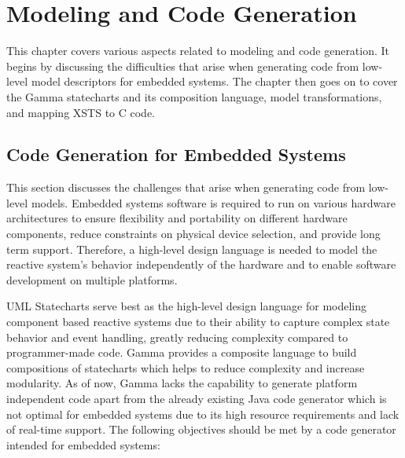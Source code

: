 \chapter{Modeling and Code Generation}

This chapter covers various aspects related to modeling and code generation. It begins by discussing the difficulties that arise when generating code from low-level model descriptors for embedded systems. The chapter then goes on to cover the Gamma statecharts and its composition language, model transformations, and mapping XSTS to C code.

\section{Code Generation for Embedded Systems}

This section discusses the challenges that arise when generating code from low-level models. Embedded systems software is required to run on various hardware architectures to ensure flexibility and portability on different hardware components, reduce constraints on physical device selection, and provide long term support. Therefore, a high-level design language is needed to model the reactive system's behavior independently of the hardware and to enable software development on multiple platforms. 

UML Statecharts serve best as the high-level design language for modeling component based reactive systems due to their ability to capture complex state behavior and event handling, greatly reducing complexity compared to programmer-made code. Gamma provides a composite language to build compositions of statecharts which helps to reduce complexity and increase modularity. As of now, Gamma lacks the capability to generate platform independent code apart from the already existing Java code generator which is not optimal for embedded systems due to its high resource requirements and lack of real-time support. The following objectives should be met by a code generator intended for embedded systems:

